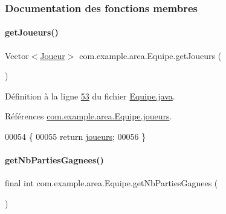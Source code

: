 \subsubsection{Documentation des fonctions membres}
\mbox{\label{classcom_1_1example_1_1area_1_1_equipe_aa681b4ea72d93a16fc8384fa3ccc8b21}} 
\paragraph{\texorpdfstring{get\+Joueurs()}{getJoueurs()}}
{\footnotesize\ttfamily Vector$<$\hyperlink{classcom_1_1example_1_1area_1_1_joueur}{Joueur}$>$ com.\+example.\+area.\+Equipe.\+get\+Joueurs (\begin{DoxyParamCaption}{ }\end{DoxyParamCaption})}



Définition à la ligne \hyperlink{_equipe_8java_source_l00053}{53} du fichier \hyperlink{_equipe_8java_source}{Equipe.\+java}.



Références \hyperlink{_equipe_8java_source_l00027}{com.\+example.\+area.\+Equipe.\+joueurs}.


\begin{DoxyCode}
00054     \{
00055         \textcolor{keywordflow}{return} \hyperlink{classcom_1_1example_1_1area_1_1_equipe_a13f5e9288dec5f11829e1a7ccc21cdc9}{joueurs};
00056     \}
\end{DoxyCode}
\mbox{\label{classcom_1_1example_1_1area_1_1_equipe_a1ba6f14b9b168e283d5d6417ad0a5ed2}} 
\paragraph{\texorpdfstring{get\+Nb\+Parties\+Gagnees()}{getNbPartiesGagnees()}}
{\footnotesize\ttfamily final int com.\+example.\+area.\+Equipe.\+get\+Nb\+Parties\+Gagnees (\begin{DoxyParamCaption}{ }\end{DoxyParamCaption})}



